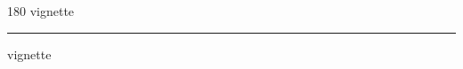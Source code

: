 
\begin{frame}
\begin{center}
\begin{turn}{180}
{\fontsize{2.5cm}{1em}\selectfont vignette}
\end{turn}
\vspace{1em}\par  
\hrule
\vspace{1em}\par  
{\fontsize{2.5cm}{1em}\selectfont vignette}
\end{center}
\end{frame}
